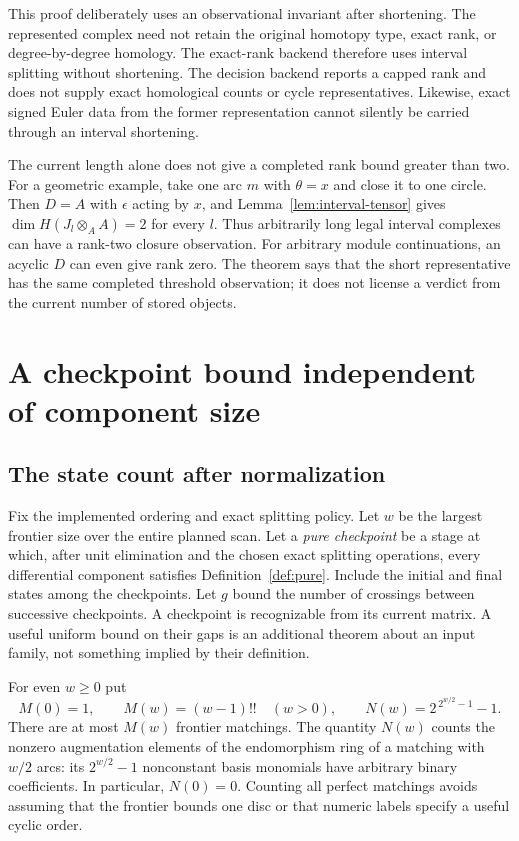 This proof deliberately uses an observational invariant after shortening.
The represented complex need not retain the original homotopy type,
exact rank, or degree-by-degree homology. The exact-rank backend therefore
uses interval splitting without shortening. The decision backend reports
a capped rank and does not supply exact homological counts or cycle
representatives. Likewise, exact signed Euler data from the former
representation cannot silently be carried through an interval shortening.

The current length alone does not give a completed rank bound greater
than two. For a geometric example, take one arc $m$ with $\theta=x$ and
close it to one circle. Then $D=A$ with $\epsilon$ acting by $x$, and
Lemma~\ref{lem:interval-tensor} gives
$\dim H(J_l\otimes_A A)=2$ for every $l$. Thus arbitrarily long legal
interval complexes can have a rank-two closure observation. For
arbitrary module continuations, an acyclic $D$ can even give rank zero.
The theorem says that the short representative has the same completed
threshold observation; it does not license a verdict from the current
number of stored objects.

\section{A checkpoint bound independent of component size}
\label{sec:checkpoint-complexity}

\subsection{The state count after normalization}

Fix the implemented ordering and exact splitting policy. Let $w$ be the
largest frontier size over the entire planned scan. Let a \emph{pure
checkpoint} be a stage at which, after unit elimination and the chosen
exact splitting operations, every differential component satisfies
Definition~\ref{def:pure}. Include the initial and final states among
the checkpoints. Let $g$ bound the number of crossings between
successive checkpoints. A checkpoint is recognizable from its current
matrix. A useful uniform bound on their gaps is an additional theorem
about an input family, not something implied by their definition.

For even $w\ge0$ put
\begin{equation}\label{eq:M-N}
 M(0)=1,\qquad M(w)=(w-1)!!\quad(w>0),
 \qquad N(w)=2^{\,2^{w/2}-1}-1.
\end{equation}
There are at most $M(w)$ frontier matchings. The quantity $N(w)$ counts
the nonzero augmentation elements of the endomorphism ring of a
matching with $w/2$ arcs: its $2^{w/2}-1$ nonconstant basis monomials
have arbitrary binary coefficients. In particular, $N(0)=0$.
Counting all perfect matchings avoids assuming that the frontier bounds
one disc or that numeric labels specify a useful cyclic order.

